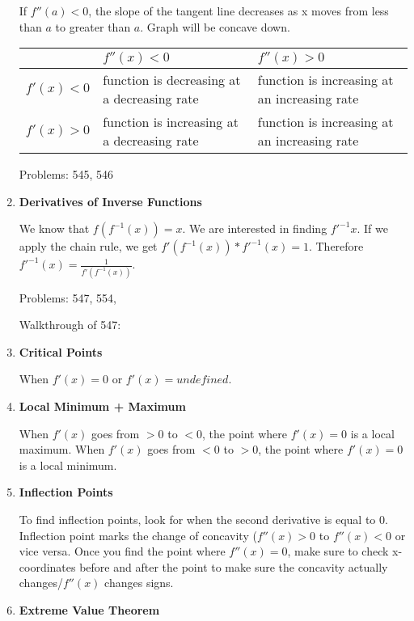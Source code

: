 \documentclass{article}
\begin{document}
\begin{enumerate}
If $f''(a) < 0$, the slope of the tangent line decreases as x moves from less than $a$ to greater than $a$. Graph will be concave down.

\begin{center}
\begin{tabularx}{0.8\textwidth} {
| >{\raggedright\arraybackslash}X 
| >{\centering\arraybackslash}X 
| >{\raggedleft\arraybackslash}X |}
\hline
& $f''(x) < 0$ & $f''(x) > 0$ \\
\hline
$f'(x) < 0$ & function is decreasing at a decreasing rate & function is increasing at an increasing rate\\ 
\hline
$f'(x) > 0$ & function is increasing at a decreasing rate & function is increasing at an increasing rate \\
\hline
\end{tabularx}
\end{center}

Problems: 545, 546

\item \textbf{Derivatives of Inverse Functions}

We know that $f(f^{-1}(x)) = x$. We are interested in finding $f'^{-1}x$. If we apply the chain rule, we get $f'(f^{-1}(x)) * f'^{-1}(x) = 1$. Therefore
$f'^{-1}(x) = \frac{1}{f'(f^{-1}(x))}$.

Problems: 547, 554, 

Walkthrough of 547:


\item \textbf{Critical Points}

When $f'(x) = 0$ or $f'(x) = undefined$. 

\item \textbf{Local Minimum + Maximum}

When $f'(x)$ goes from $ > 0$ to $ < 0$, the point where $f'(x) = 0$ is a local maximum. When $f'(x)$ goes from $ < 0$ to $ > 0$, the point where $f'(x) = 0$ is a local minimum. 

\item \textbf{Inflection Points}

To find inflection points, look for when the second derivative is equal to 0. Inflection point marks the change of concavity ($f''(x) > 0$ to $f''(x) < 0$ or vice versa. Once you find the point where $f''(x) = 0$, make sure to check x-coordinates before and after the point to make sure the concavity actually changes/$f''(x)$ changes signs. 

\item \textbf{Extreme Value Theorem}


\end{enumerate}
\end{document}
